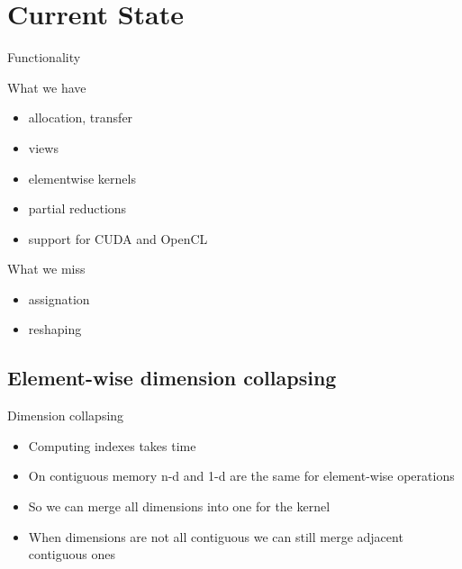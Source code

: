 \documentclass[utf8x,xcolor=pdftex,dvipsnames,table]{beamer}
\begin{document}
\section{Current State}

\begin{frame}{Functionality}
\begin{block}{What we have}
\begin{itemize}
\item allocation, transfer
\item views
\item elementwise kernels
\item partial reductions
\item support for CUDA and OpenCL
\end{itemize}
\end{block}
\begin{block}{What we miss}
\begin{itemize}
\item assignation
\item reshaping
\end{itemize}
\end{block}
\end{frame}

\subsection{Element-wise dimension collapsing}
\begin{frame}{Dimension collapsing}
\begin{itemize}
\item Computing indexes takes time
\item On contiguous memory n-d and 1-d are the same for element-wise operations
\item So we can merge all dimensions into one for the kernel
\item When dimensions are not all contiguous we can still merge adjacent contiguous ones
\end{itemize}
\end{frame}
\end{document}
